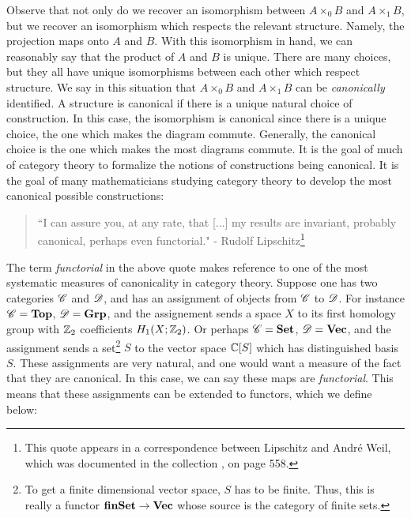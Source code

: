 \documentclass{article}
\theoremstyle{definition}
\numberwithin{figure}{section}
\begin{document}
Observe that not only do we recover an isomorphism between $A\times_0 B$ and $A\times _1 B$, but we recover an isomorphism which respects the relevant structure. Namely, the projection maps onto $A$ and $B$. With this isomorphism in hand, we can reasonably say that the product of $A$ and $B$ is unique. There are many choices, but they all have unique isomorphisms between each other which respect structure. We say in this situation that $A\times_0 B$ and $A\times_1 B$ can be \textit{canonically} identified. A structure is canonical if there is a unique natural choice of construction. In this case, the isomorphism is canonical since there is a unique choice, the one which makes the diagram commute. Generally, the canonical choice is the one which makes the most diagrams commute. It is the goal of much of category theory to formalize the notions of constructions being canonical. It is the goal of many mathematicians studying category theory to develop the most canonical possible constructions:

\begin{quote}
``I can assure you, at any rate, that [...] my results are invariant, probably canonical, perhaps even functorial." - Rudolf Lipschitz\footnote{This quote appears in a correspondence between Lipschitz and André Weil, which was documented in the collection \cite{weil2009oeuvres}, on page 558.}
\end{quote}

The term \textit{functorial} in the above quote makes reference to one of the most systematic measures of canonicality in category theory. Suppose one has two categories $\mathscr{C}$ and $\mathscr{D}$, and has an assignment of objects from $\mathscr{C}$ to $\mathscr{D}$. For instance $\mathscr{C}=\bold{Top}$, $\mathscr{D}=\bold{Grp}$, and the assignement sends a space $X$ to its first homology group with $\mathbb{Z}_2$ coefficients $H_1(X;\mathbb{Z}_2)$. Or perhaps $\mathscr{C}=\bold{Set}$, $\mathscr{D}=\bold{Vec}$, and the assignment sends a set\footnote{To get a finite dimensional vector space, $S$ has to be finite. Thus, this is really a functor $\bold{finSet}\to \bold{Vec}$ whose source is the category of finite sets.} $S$ to the vector space $\mathbb{C}[S]$ which has distinguished basis $S$. These assignments are very natural, and one would want a measure of the fact that they are canonical. In this case, we can say these maps are \textit{functorial}. This means that these assignments can be extended to functors, which we define below:
\end{document}

